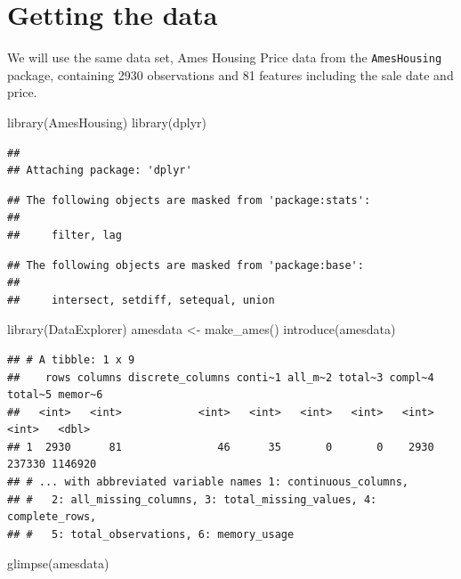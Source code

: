 \documentclass[
]{book}
\newenvironment{Shaded}{\begin{snugshade}}{\end{snugshade}}
\newcommand{\FunctionTok}[1]{\textcolor[rgb]{0.00,0.00,0.00}{#1}}
\newcommand{\NormalTok}[1]{#1}
\newcommand{\OtherTok}[1]{\textcolor[rgb]{0.56,0.35,0.01}{#1}}
\begin{document}
\hypertarget{getting-the-data}{%
\section{Getting the data}\label{getting-the-data}}

We will use the same data set, Ames Housing Price data from the \texttt{AmesHousing} package, containing 2930 observations and 81 features including the sale date and price.

\begin{Shaded}
\begin{Highlighting}[]
\FunctionTok{library}\NormalTok{(AmesHousing)}
\FunctionTok{library}\NormalTok{(dplyr)}
\end{Highlighting}
\end{Shaded}

\begin{verbatim}
## 
## Attaching package: 'dplyr'
\end{verbatim}

\begin{verbatim}
## The following objects are masked from 'package:stats':
## 
##     filter, lag
\end{verbatim}

\begin{verbatim}
## The following objects are masked from 'package:base':
## 
##     intersect, setdiff, setequal, union
\end{verbatim}

\begin{Shaded}
\begin{Highlighting}[]
\FunctionTok{library}\NormalTok{(DataExplorer)}
\NormalTok{amesdata }\OtherTok{\textless{}{-}} \FunctionTok{make\_ames}\NormalTok{()}
\FunctionTok{introduce}\NormalTok{(amesdata)}
\end{Highlighting}
\end{Shaded}

\begin{verbatim}
## # A tibble: 1 x 9
##    rows columns discrete_columns conti~1 all_m~2 total~3 compl~4 total~5 memor~6
##   <int>   <int>            <int>   <int>   <int>   <int>   <int>   <int>   <dbl>
## 1  2930      81               46      35       0       0    2930  237330 1146920
## # ... with abbreviated variable names 1: continuous_columns,
## #   2: all_missing_columns, 3: total_missing_values, 4: complete_rows,
## #   5: total_observations, 6: memory_usage
\end{verbatim}

\begin{Shaded}
\begin{Highlighting}[]
\FunctionTok{glimpse}\NormalTok{(amesdata)}
\end{Highlighting}
\end{Shaded}
\end{document}
